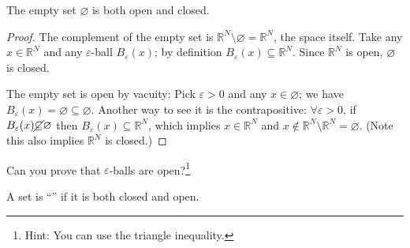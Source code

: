 \documentclass{article}
\begin{document}
%
%

\begin{claim}
  The empty set $\varnothing$ is both open and closed.
\end{claim}

\begin{proof}
  The complement of the empty set is $\mathbb{R}^N \setminus \varnothing = \mathbb{R}^N$, the space itself. Take any $x \in \mathbb{R}^N$ and any $\varepsilon$-ball $B_{\varepsilon}(x)$; by definition $B_{\varepsilon}(x) \subseteq \mathbb{R}^N$. Since $\mathbb{R}^N$ is open, $\varnothing$ is closed.

  The empty set is open by vacuity: Pick $\varepsilon > 0$ and any $x \in \varnothing$; we have $B_{\varepsilon}(x) = \varnothing \subseteq \varnothing$. Another way to see it is the contrapositive: $\forall \varepsilon > 0$, if $B_{\varepsilon}(x) \cancel\subseteq \varnothing$ then $B_{\varepsilon}(x) \subseteq \mathbb{R}^N$, which implies $x \in \mathbb{R}^N$ and $x \notin \mathbb{R}^N \setminus \mathbb{R}^N = \varnothing$. (Note this  also implies $\mathbb{R}^N$ is closed.)
\end{proof}

Can you prove that $\varepsilon$-balls are open?\footnote{Hint: You can use the triangle inequality.}
\begin{definition}[clopen]\label{def:lecture1_clopen}
  A set is ``'' if it is both closed and open.
\end{definition}

%
\end{document}
